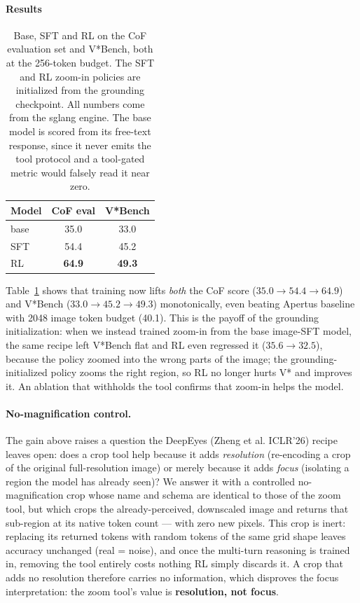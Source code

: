 \documentclass[10pt,twocolumn]{article}
\begin{document}
\paragraph{Results}

\begin{table}[t]
\centering\small
\begin{tabular}{lcc}
\toprule
Model & CoF eval  & V*Bench  \\
\midrule
base & 35.0          & 33.0 \\
SFT  & 54.4          & 45.2 \\
RL   & \textbf{64.9} & \textbf{49.3} \\
\bottomrule
\end{tabular}
\caption{Base, SFT and RL on the CoF evaluation set and
V*Bench, both at the 256-token budget. The SFT and RL zoom-in policies are
initialized from the grounding checkpoint. All numbers come from the sglang engine. The base model is scored from its free-text response, since it
never emits the tool protocol and a tool-gated metric would falsely read it near
zero.}
\label{tab:vstar}
\end{table}

Table~\ref{tab:vstar} shows that training now lifts \emph{both} the
CoF score ($35.0\!\to\!54.4\!\to\!64.9$) and V*Bench ($33.0\!\to\!45.2\!\to\!49.3$)
monotonically, even beating Apertus baseline with 2048 image token budget (40.1). This is the payoff of the grounding initialization: when we instead
trained zoom-in from the base image-SFT model, the same recipe left V*Bench flat and
RL even regressed it ($35.6\!\to\!32.5$), because the policy zoomed into the wrong
parts of the image; the grounding-initialized policy zooms the right region, so RL
no longer hurts V* and improves it. An ablation that withholds the tool confirms that zoom-in helps the model.

\paragraph{No-magnification control.} The gain above raises a question the
DeepEyes (Zheng et al. ICLR'26) recipe leaves open: does a crop tool help because it adds
\emph{resolution} (re-encoding a crop of the original full-resolution image) or
merely because it adds \emph{focus} (isolating a region the model has already
seen)? We answer it with a controlled no-magnification crop whose name and
schema are identical to those of the zoom tool, but which crops the already-perceived,
downscaled image and returns that sub-region at its native token count --- with
zero new pixels. This crop is inert: replacing its returned tokens with
random tokens of the same grid shape leaves accuracy unchanged (real =
noise), and once the multi-turn reasoning is trained in, removing the tool
entirely costs nothing RL simply discards it. A crop that adds no resolution
therefore carries no information, which disproves the focus interpretation: the
zoom tool's value is \textbf{resolution, not focus}.
\end{document}
